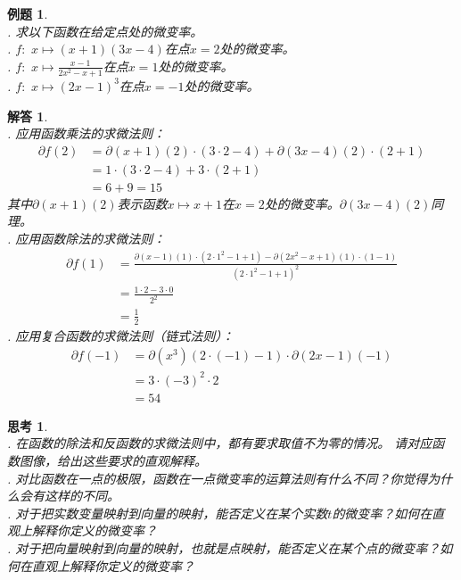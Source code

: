 \documentclass[12pt,UTF8]{ctexbook}
\newtheorem{et}{例题}[section]
\newtheorem{sk}{思考}[section]
\newtheorem*{so}{解答}
\begin{document}
\begin{et}
    \mbox{} \\
    . 求以下函数在给定点处的微变率。\\
    . $f: \,\, x \mapsto (x + 1)(3x -4)$在点$x = 2$处的微变率。\\
    . $f: \,\, x \mapsto \frac{x - 1}{2x^2 - x + 1}$在点$x = 1$处的微变率。\\
    . $f: \,\, x \mapsto (2x - 1)^3$在点$x = -1$处的微变率。\\
\end{et}

\begin{so}
    \mbox{} \\
    . 应用函数乘法的求微法则：
    \begin{align*}
        \partial f(2) &= \partial (x + 1) (2) \cdot (3 \cdot 2 - 4) + \partial (3x - 4) (2) \cdot (2 + 1)  \\
        &= 1 \cdot (3 \cdot 2 - 4) + 3 \cdot (2 + 1)  \\
        &= 6 + 9 = 15   
    \end{align*}
    其中$\partial (x + 1) (2)$表示函数$x\mapsto x + 1$在$x = 2$处的微变率。$\partial (3x - 4) (2)$同理。\\
    . 应用函数除法的求微法则：
    \begin{align*}
        \partial f(1) &= \frac{\partial (x - 1) (1) \cdot (2 \cdot 1^2 - 1 + 1) - \partial (2x^2 - x + 1) (1) \cdot (1 - 1)}{(2\cdot 1^2 - 1 + 1)^2}  \\
        &= \frac{ 1 \cdot 2 - 3 \cdot 0}{2^2}  \\
        &= \frac{1}{2}   
    \end{align*}
    . 应用复合函数的求微法则（链式法则）：
    \begin{align*}
        \partial f(-1) &= \partial (x^3) (2\cdot (-1) - 1) \cdot \partial (2x - 1) (-1)  \\
        &= 3\cdot (-3)^2 \cdot 2  \\
        &= 54   
    \end{align*}

\end{so}

\begin{sk}
    \mbox{} \\
    . 在函数的除法和反函数的求微法则中，都有要求取值不为零的情况。
    请对应函数图像，给出这些要求的直观解释。\\
    . 对比函数在一点的极限，函数在一点微变率的运算法则有什么不同？你觉得为什么会有这样的不同。\\
    . 对于把实数变量映射到向量的映射，能否定义在某个实数$t$的微变率？如何在直观上解释你定义的微变率？\\
    . 对于把向量映射到向量的映射，也就是点映射，能否定义在某个点的微变率？如何在直观上解释你定义的微变率？
    
\end{sk}
\end{document}
